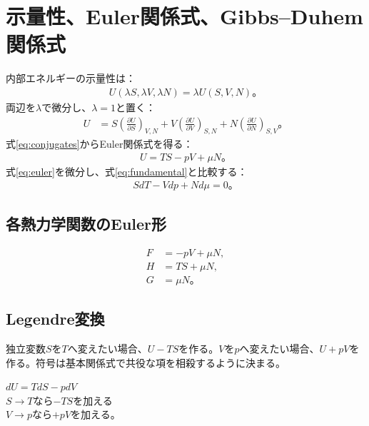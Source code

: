 \documentclass[platex,dvipdfmx,a4paper,10pt]{jsarticle}
\newcommand{\flow}[1]{\begin{center}\begin{minipage}{0.94\textwidth}\centering #1\end{minipage}\end{center}}
\begin{document}
\newpage
\section{示量性、Euler関係式、Gibbs--Duhem関係式}\label{sec:euler}
内部エネルギーの示量性は：
\begin{align}
  U(\lambda S,\lambda V,\lambda N)=\lambda U(S,V,N)。\label{eq:homogeneous}
\end{align}
両辺を$\lambda$で微分し、$\lambda=1$と置く：
\begin{align*}
  U&=S\left(\frac{\partial U}{\partial S}\right)_{V,N}
  +V\left(\frac{\partial U}{\partial V}\right)_{S,N}
  +N\left(\frac{\partial U}{\partial N}\right)_{S,V}。
\end{align*}
式\eqref{eq:conjugates}からEuler関係式を得る：
\begin{align}
  U=TS-pV+\mu N。\label{eq:euler}
\end{align}
式\eqref{eq:euler}を微分し、式\eqref{eq:fundamental}と比較する：
\begin{align}
  SdT-Vdp+Nd\mu=0。\label{eq:gibbs-duhem}
\end{align}

\subsection{各熱力学関数のEuler形}
\begin{align}
  F&=-pV+\mu N,\\
  H&=TS+\mu N,\\
  G&=\mu N。\label{eq:euler-potentials}
\end{align}

\subsection{Legendre変換}
独立変数$S$を$T$へ変えたい場合、$U-TS$を作る。$V$を$p$へ変えたい場合、$U+pV$を作る。符号は基本関係式で共役な項を相殺するように決まる。
\flow{$dU=TdS-pdV$\\$S\to T$なら$-TS$を加える\\$V\to p$なら$+pV$を加える。}

\newpage
\end{document}
